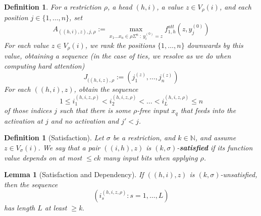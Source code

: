 \documentclass[11pt,letterpaper]{article}
\newcommand{\key}[1]{\textbf{#1}}
\newcounter{theorem}
\newtheorem{defin}[theorem]{Definition}
\newtheorem{lemma}[theorem]{Lemma}
\begin{document}
\begin{defin}
For a restriction $\rho$, a head $(h,i)$, a value $z \in V_\rho(i)$,  and each position $j \in \{1, \dots, n\}$, set
\begin{equation}\label{eq:max-att}
A_{((h,i),z),j,\rho} := \max_{x_1\dots x_n \in \rho\Sigma^n\ :\ y^{(0)}_i=z} f^{att}_{1,h}(z, y^{(0)}_j)
\end{equation}
For each value $z \in V_\rho(i)$, we rank the positions $\{1, \dots, n\}$ downwards by this value, obtaining a sequence (in the case of ties, we resolve as we do when computing hard attention)
\begin{equation}
J_{((h,i,z), \rho} := \left(j_1^{(z)}, \dots, j_n^{(z)}\right)    
\end{equation}
For each $((h,i),z)$, obtain the sequence
\begin{equation}
1 \leq i_1^{(h,i,z,\rho)} < i_2^{(h,i,z,\rho)} < \dots < i_{L}^{(h,i,z,\rho)} \leq n
\end{equation}
of those indices $j$ such that there is some $\rho$-free input $x_q$ that feeds into the activation at $j$ and no activation and $j' < j$.
\end{defin}




\begin{defin}[Satisfaction]
Let $\sigma$ be a restriction, and $k \in \mathbb{N}$, and assume  $z \in V_\sigma(i)$.
We say that a pair $((i,h),z)$ is $(k,\sigma)$-\key{satisfied} if %
its function value depends on at most $\leq ck$ many input bits when applying $\rho$.
\end{defin}

\begin{lemma}[Satisfaction and Dependency]\label{lemma:satis-dep}
If $((h,i),z)$ is $(k,\sigma)$-unsatisfied, then the sequence
\begin{equation}
\left(   i_s^{(h,i,z,\rho)} : s=1, \dots, L   \right)
\end{equation}
has length $L$ at least $\geq $k.
\end{lemma}
\end{document}
